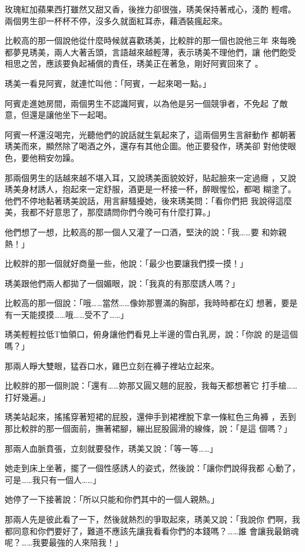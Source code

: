 玫瑰紅加蘋果西打雖然又甜又香，後挫力卻很強，琇美保持著戒心，淺酌
輕嚐。兩個男生卻一杯杯不停，沒多久就面紅耳赤，藉酒裝瘋起來。

比較高的那一個說他從什麼時候就喜歡琇美，比較胖的那一個也說他三年
來每晚都夢見琇美，兩人大著舌頭，言語越來越輕薄，表示琇美不理他們，讓
他們飽受相思之苦，應該要負起補償的責任，琇美正在著急，剛好阿賓回來了
。

琇美一看見阿賓，就連忙叫他：「阿賓，一起來喝一點。」

阿賓走進她房間，兩個男生不認識阿賓，以為他是另一個競爭者，不免起
了敵意，但還是讓他坐下一起喝。

阿賓一杯還沒喝完，光聽他們的說話就生氣起來了，這兩個男生言辭動作
都朝著琇美而來，顯然除了喝酒之外，還存有其他企圖。他正要發作，琇美卻
對他使眼色，要他稍安勿躁。

那兩個男生的話越來越不堪入耳，又說琇美面貌姣好，貼起臉來一定過癮
，又說琇美身材誘人，抱起來一定舒服，酒更是一杯接一杯，醉眼惺忪，都喝
糊塗了。他們不停地黏著琇美說話，用言辭騷擾她，後來琇美問：「看你們把
我說得這麼美，我都不好意思了，那麼請問你們今晚可有什麼打算。」

他們想了一想，比較高的那一個人又灌了一口酒，堅決的說：「我……要
和妳親熱！」

比較胖的那一個就好商量一些，他說：「最少也要讓我們摸一摸！」

琇美跟他們兩人都拋了一個媚眼，說：「我真的有那麼誘人嗎？」

比較高的那一個說：「哦……當然……像妳那豐滿的胸部，我時時都在幻
想著，要是有一天能摸摸……哦……受不了……」

琇美輕輕拉低T恤領口，俯身讓他們看見上半邊的雪白乳房，說：「你說
的是這個嗎？」

那兩人睜大雙眼，猛吞口水，雞巴立刻在褲子裡站立起來。

比較胖的那一個則說：「還有……妳那又圓又翹的屁股，我每天都想著它
打手槍……打好幾遍。」

琇美站起來，搖搖穿著短裙的屁股，還伸手到裙裡脫下拿一條紅色三角褲
，丟到那比較胖的那一個面前，撫著裙腳，繃出屁股圓滑的線條，說：「是這
個嗎？」

那兩人血脈賁張，立刻就要發作，琇美又說：「等一等……」

她走到床上坐著，擺了一個性感誘人的姿式，然後說：「讓你們說得我都
心動了，可是……我只有一個人……」

她停了一下接著說：「所以只能和你們其中的一個人親熱。」

那兩人先是彼此看了一下，然後就熱烈的爭取起來，琇美又說：「我說你
們啊，我都同意和你們要好了，難道不應該先讓我看看你們的本錢嗎？……誰
會讓我最銷魂呢？……我要最強的人來陪我！」

